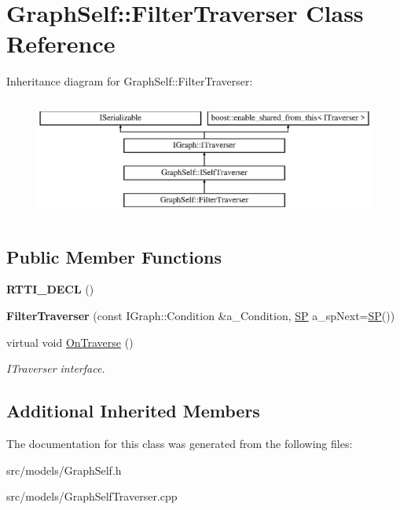 \hypertarget{class_graph_self_1_1_filter_traverser}{}\section{Graph\+Self\+:\+:Filter\+Traverser Class Reference}
\label{class_graph_self_1_1_filter_traverser}
Inheritance diagram for Graph\+Self\+:\+:Filter\+Traverser\+:\begin{figure}[H]
\begin{center}
\leavevmode
\includegraphics[height=3.985765cm]{class_graph_self_1_1_filter_traverser}
\end{center}
\end{figure}
\subsection*{Public Member Functions}
\begin{DoxyCompactItemize}
\item 
\mbox{\label{class_graph_self_1_1_filter_traverser_a76f6fa960d73a24728d6a0e32bf655d5}} 
{\bfseries R\+T\+T\+I\+\_\+\+D\+E\+CL} ()
\item 
\mbox{\label{class_graph_self_1_1_filter_traverser_aa4ce9966949e413864ab4f076424bb16}} 
{\bfseries Filter\+Traverser} (const I\+Graph\+::\+Condition \&a\+\_\+\+Condition, \hyperlink{class_i_graph_1_1_i_traverser_a5a5ccc81423d6024742d1898a310d812}{SP} a\+\_\+sp\+Next=\hyperlink{class_i_graph_1_1_i_traverser_a5a5ccc81423d6024742d1898a310d812}{SP}())
\item 
\mbox{\label{class_graph_self_1_1_filter_traverser_a839817b842e5c6276a3889703d6b507d}} 
virtual void \hyperlink{class_graph_self_1_1_filter_traverser_a839817b842e5c6276a3889703d6b507d}{On\+Traverse} ()
\begin{DoxyCompactList}\small\item\em I\+Traverser interface. \end{DoxyCompactList}\end{DoxyCompactItemize}
\subsection*{Additional Inherited Members}


The documentation for this class was generated from the following files\+:\begin{DoxyCompactItemize}
\item 
src/models/Graph\+Self.\+h\item 
src/models/Graph\+Self\+Traverser.\+cpp\end{DoxyCompactItemize}
